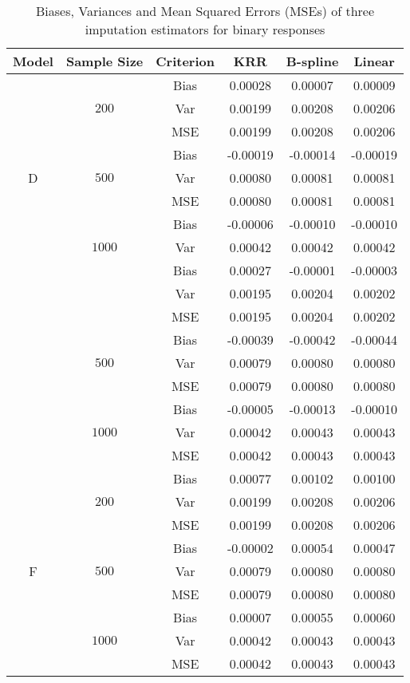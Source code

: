 \documentclass[12pt]{article}
\begin{document}
\begin{table}[!ht]
\centering
\caption{Biases, Variances and Mean Squared Errors (MSEs) of three imputation estimators for binary responses}\label{MAR, nonlinear, comparison, DEF}
{
\begin{tabular}{cccccc}
  \hline

Model & Sample Size & Criterion & KRR & B-spline & Linear  \\ 
  \hline
 \multirow{9}{*}{D} &  \multirow{3}{*}{$200$}& Bias & 0.00028 & 0.00007 & 0.00009 \\ 
 & & Var & 0.00199 & 0.00208 & 0.00206 \\ 
 & & MSE & 0.00199 & 0.00208 & 0.00206 \\ 
 \cline{3-6}
 &\multirow{3}{*}{$500$} & Bias & -0.00019 & -0.00014 & -0.00019 \\ 
 & & Var & 0.00080 & 0.00081 & 0.00081 \\ 
 & & MSE & 0.00080 & 0.00081 & 0.00081 \\ 
 \cline{3-6}
 &\multirow{3}{*}{$1000$} & Bias & -0.00006 & -0.00010 & -0.00010 \\ 
 & & Var & 0.00042 & 0.00042 & 0.00042 \\ 
  \hline
 \multirow{9}{*}{E} &  \multirow{3}{*}{$200$}& Bias & 0.00027 & -0.00001 & -0.00003 \\ 
 & & Var & 0.00195 & 0.00204 & 0.00202 \\ 
 & & MSE & 0.00195 & 0.00204 & 0.00202 \\ 
 \cline{3-6}
 &\multirow{3}{*}{$500$}  & Bias & -0.00039 & -0.00042 & -0.00044 \\ 
 & & Var & 0.00079 & 0.00080 & 0.00080 \\ 
 & & MSE & 0.00079 & 0.00080 & 0.00080 \\ 
  \cline{3-6}
 &\multirow{3}{*}{$1000$}  & Bias & -0.00005 & -0.00013 & -0.00010 \\ 
 & & Var & 0.00042 & 0.00043 & 0.00043 \\ 
 & & MSE & 0.00042 & 0.00043 & 0.00043 \\ 
   \hline
 \multirow{9}{*}{F} &  \multirow{3}{*}{$200$}& Bias & 0.00077 & 0.00102 & 0.00100 \\ 
 & & Var & 0.00199 & 0.00208 & 0.00206 \\ 
 & & MSE & 0.00199 & 0.00208 & 0.00206 \\ 
  \cline{3-6}
 &\multirow{3}{*}{$500$}  & Bias & -0.00002 & 0.00054 & 0.00047 \\ 
 & & Var & 0.00079 & 0.00080 & 0.00080 \\ 
 & & MSE & 0.00079 & 0.00080 & 0.00080 \\ 
  \cline{3-6}
 &\multirow{3}{*}{$1000$}  & Bias & 0.00007 & 0.00055 & 0.00060 \\ 
 & & Var & 0.00042 & 0.00043 & 0.00043 \\ 
 & & MSE & 0.00042 & 0.00043 & 0.00043 \\ 
\hline
\end{tabular}
}
\end{table}
\end{document}
